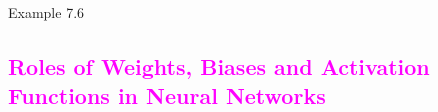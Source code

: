 \documentclass{book}
\begin{document}
\begin{egBox}{Example 7.6}{}
\begin{center}
\begin{minipage}{0.5\textwidth}
            \end{minipage}
        \end{center}
\end{egBox}
\textcolor{magenta}{\section{\textbf{Roles of Weights, Biases and Activation Functions in Neural Networks}}}
\end{document}
